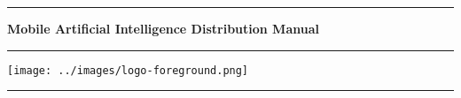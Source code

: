\documentclass[12pt,a4paper]{article}
\begin{document}
\begin{titlepage}	
    \centering
    \rule{\textwidth}{1pt}\par
    \vspace*{1.2cm}
    {\Huge\textbf{Mobile Artificial Intelligence Distribution Manual}}\\
    \vspace*{1cm}
    \rule{\textwidth}{1pt}\par
    \vspace*{\fill}
    \texttt{[image: ../images/logo-foreground.png]}\\
    \vspace*{\fill}
    \rule{\textwidth}{1pt}\par
    \vspace*{1cm}
\end{titlepage}

\tableofcontents

\newpage
\end{document}
